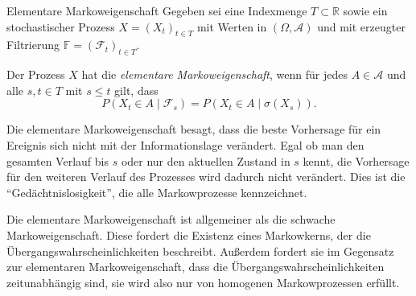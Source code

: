 \begin{defi}{Elementare Markoweigenschaft}
    Gegeben sei eine Indexmenge $T \subset \mathbb{R}$ sowie ein stochastischer Prozess $X = (X_{t})_{t\in T}$ mit Werten in $(\Omega ,{\mathcal{A}})$ und mit erzeugter Filtrierung $\mathbb{F} =({\mathcal{F}}_{t})_{t\in T}$.

    Der Prozess $X$ hat die \emph{elementare Markoweigenschaft}, wenn für jedes $A \in{\mathcal{A}}$ und alle $s,t\in T$ mit $s\leq t$ gilt, dass
    \[
        P(X_{t}\in A\mid{\mathcal{F}}_{s})=P(X_{t}\in A\mid\sigma (X_{s})).
    \]

    Die elementare Markoweigenschaft besagt, dass die beste Vorhersage für ein Ereignis sich nicht mit der Informationslage verändert.
    Egal ob man den gesamten Verlauf bis $s$ oder nur den aktuellen Zustand in $s$ kennt, die Vorhersage für den weiteren Verlauf des Prozesses wird dadurch nicht verändert.
    Dies ist die \enquote{Gedächtnislosigkeit}, die alle Markowprozesse kennzeichnet.

    Die elementare Markoweigenschaft ist allgemeiner als die schwache Markoweigenschaft.
    Diese fordert die Existenz eines Markowkerns, der die Übergangswahrscheinlichkeiten beschreibt.
    Außerdem fordert sie im Gegensatz zur elementaren Markoweigenschaft, dass die Übergangswahrscheinlichkeiten zeitunabhängig sind, sie wird also nur von homogenen Markowprozessen erfüllt.
\end{defi}

